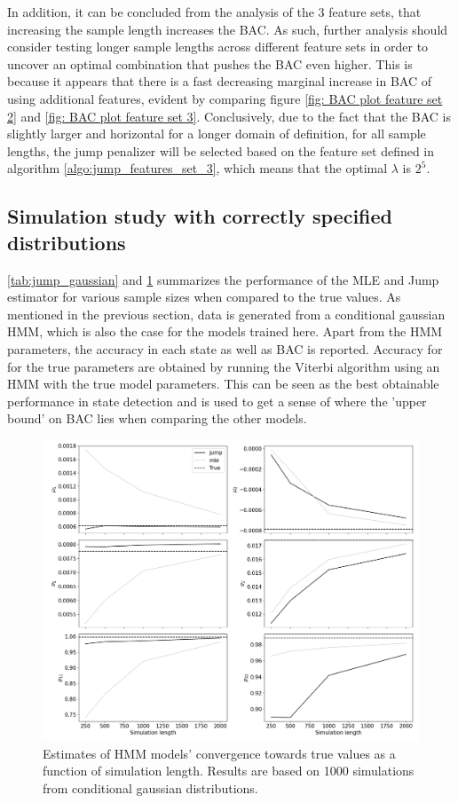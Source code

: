 In addition, it can be concluded from the analysis of the 3 feature sets, that increasing the sample length increases the BAC. As such, further analysis should consider testing longer sample lengths across different feature sets in order to uncover an optimal combination that pushes  the BAC even higher. This is because it appears that there is a fast decreasing marginal increase in BAC of using additional features, evident by comparing figure \ref{fig: BAC plot feature set 2} and \ref{fig: BAC plot feature set 3}. Conclusively, due to the fact that the BAC is slightly larger and horizontal for a longer domain of definition, for all sample lengths, the jump penalizer will be selected based on the feature set defined in algorithm \ref{algo:jump_features_set_3}, which means that the optimal $\lambda$ is $2^5$. 

\subsection{Simulation study with correctly specified distributions}

\cref{tab:jump_gaussian} and \cref{fig:jump_normal} summarizes the performance of the MLE and Jump estimator for various sample sizes when compared to the true values. As mentioned in the previous section, data is generated from a conditional gaussian HMM, which is also the case for the models trained here. Apart from the HMM parameters, the accuracy in each state as well as BAC is reported. Accuracy for for the true parameters are obtained by running the Viterbi algorithm using an HMM with the true model parameters. This can be seen as the best obtainable performance in state detection and is used to get a sense of where the 'upper bound' on BAC lies when comparing the other models.

\begin{figure}[H] 
    \centering
    \includegraphics[width=1\textwidth]{analysis/model_convergence/images/simulation_normal.png}
    \caption{Estimates of HMM models' convergence towards true values as a function of simulation length. Results are based on 1000 simulations from conditional gaussian distributions.}
    \label{fig:jump_normal}
\end{figure}

